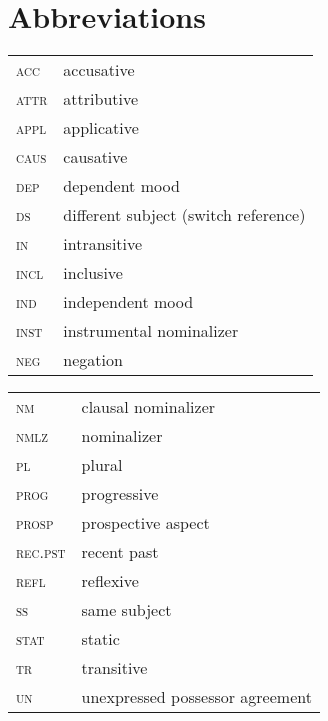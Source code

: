 \documentclass[output=paper]{langscibook}
\begin{document}
\section*{Abbreviations}
\begin{tabularx}{.5\textwidth}{@{}lQ}
{\scshape acc} & accusative\\
{\scshape attr} & attributive\\ 
{\scshape appl} & applicative\\
{\scshape caus} & causative\\
{\scshape dep} & dependent mood\\
{\scshape ds} & different subject (switch reference)\\
{\scshape in} & intransitive \\
{\scshape incl} & inclusive\\
{\scshape ind} & independent mood\\
{\scshape inst} & instrumental nominalizer\\
{\scshape neg} & negation\\
\end{tabularx}%
\begin{tabularx}{.5\textwidth}{lQ@{}}
 {\scshape nm} & clausal nominalizer\\
 {\scshape nmlz} & nominalizer\\
 {\scshape pl} & plural\\
 {\scshape prog} & progressive\\
 {\scshape prosp} & prospective aspect\\
 {\scshape rec.pst} & recent past\\
 {\scshape refl} & reflexive\\
 {\scshape ss} & same subject\\
 {\scshape stat} & static\\
 {\scshape tr} & transitive\\
 {\scshape un} & unexpressed possessor agreement\\
\end{tabularx}

{\sloppy\printbibliography[heading=subbibliography,notkeyword=this]}
\end{document}
